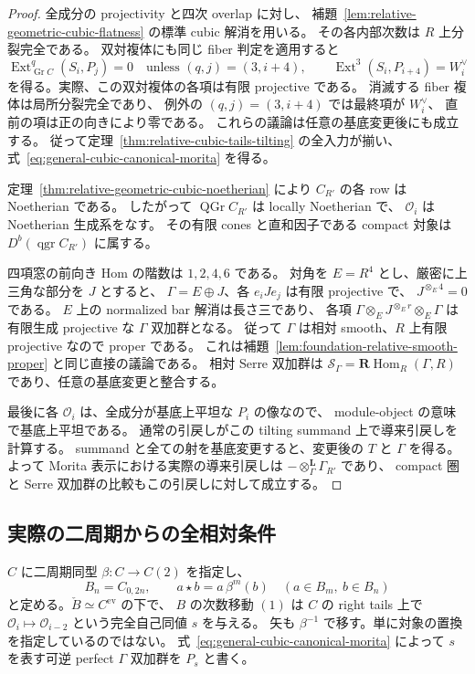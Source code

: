 \begin{proof}
全成分の projectivity と四次 overlap に対し、
補題~\ref{lem:relative-geometric-cubic-flatness} の標準 cubic 解消を用いる。
その各内部次数は $R$ 上分裂完全である。
双対複体にも同じ fiber 判定を適用すると
\[
 \operatorname{Ext}^q_{\operatorname{Gr}C}(S_i,P_j)=0
 \quad\text{unless }(q,j)=(3,i+4),\qquad
 \operatorname{Ext}^3(S_i,P_{i+4})=W_i^\vee
\]
を得る。実際、この双対複体の各項は有限 projective である。
消滅する fiber 複体は局所分裂完全であり、
例外の $(q,j)=(3,i+4)$ では最終項が $W_i^\vee$、
直前の項は正の向きにより零である。
これらの議論は任意の基底変更後にも成立する。
従って定理~\ref{thm:relative-cubic-tails-tilting} の全入力が揃い、
式~\eqref{eq:general-cubic-canonical-morita} を得る。

定理~\ref{thm:relative-geometric-cubic-noetherian} により
$C_{R'}$ の各 row は Noetherian である。
したがって $\operatorname{QGr}C_{R'}$ は locally Noetherian で、
$\mathcal O_i$ は Noetherian 生成系をなす。
その有限 cones と直和因子である compact 対象は
$D^b(\operatorname{qgr}C_{R'})$ に属する。

四項窓の前向き Hom の階数は $1,2,4,6$ である。
対角を $E=R^4$ とし、厳密に上三角な部分を $J$ とすると、
$\Gamma=E\oplus J$、各 $e_iJe_j$ は有限 projective で、
$J^{\otimes_E4}=0$ である。
$E$ 上の normalized bar 解消は長さ三であり、
各項 $\Gamma\otimes_EJ^{\otimes_Er}\otimes_E\Gamma$ は
有限生成 projective な $\Gamma$ 双加群となる。
従って $\Gamma$ は相対 smooth、$R$ 上有限 projective なので proper である。
これは補題~\ref{lem:foundation-relative-smooth-proper} と同じ直接の議論である。
相対 Serre 双加群は
$\mathcal S_\Gamma=\mathbf R\operatorname{Hom}_R(\Gamma,R)$
であり、任意の基底変更と整合する。

最後に各 $\mathcal O_i$ は、全成分が基底上平坦な $P_i$ の像なので、
module-object の意味で基底上平坦である。
通常の引戻しがこの tilting summand 上で導来引戻しを計算する。
summand と全ての射を基底変更すると、変更後の $T$ と $\Gamma$ を得る。
よって Morita 表示における実際の導来引戻しは
$-\otimes_\Gamma^{\mathbf L}\Gamma_{R'}$ であり、
compact 圏と Serre 双加群の比較もこの引戻しに対して成立する。
\end{proof}

\subsection{実際の二周期からの全相対条件}

$C$ に二周期同型 $\beta:C\to C(2)$ を指定し、
\[
 B_n=C_{0,2n},\qquad a\star b=a\,\beta^m(b)
 \quad(a\in B_m,\ b\in B_n)
 \tag{GC-prod}\label{eq:general-cubic-period-product}
\]
と定める。$\check B\simeq C^{\mathrm{ev}}$ の下で、
$B$ の次数移動 $(1)$ は $C$ の right tails 上で
$\mathcal O_i\mapsto\mathcal O_{i-2}$ という完全自己同値 $s$ を与える。
矢も $\beta^{-1}$ で移す。単に対象の置換を指定しているのではない。
式~\eqref{eq:general-cubic-canonical-morita} によって
$s$ を表す可逆 perfect $\Gamma$ 双加群を $P_s$ と書く。

